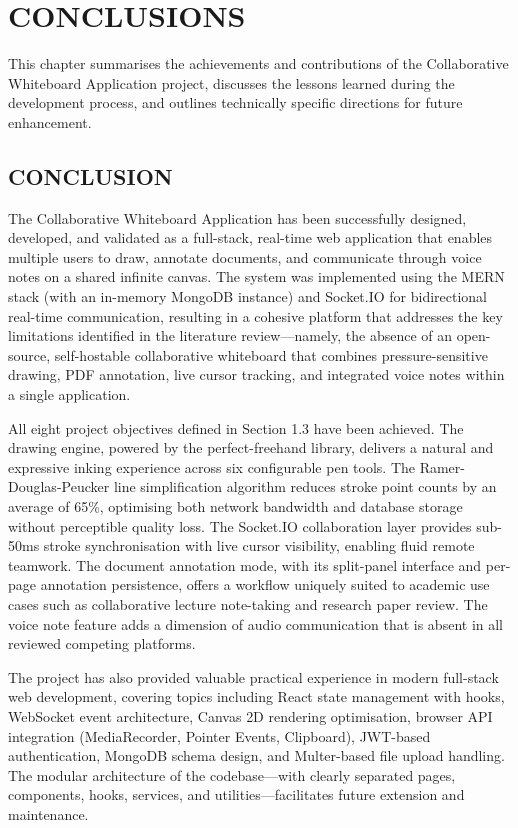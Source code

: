 \documentclass[12pt,a4paper]{report}
\begin{document}
\chapter{CONCLUSIONS}
\thispagestyle{empty}

This chapter summarises the achievements and contributions of the Collaborative Whiteboard Application project, discusses the lessons learned during the development process, and outlines technically specific directions for future enhancement.

\section{CONCLUSION}

The Collaborative Whiteboard Application has been successfully designed, developed, and validated as a full-stack, real-time web application that enables multiple users to draw, annotate documents, and communicate through voice notes on a shared infinite canvas. The system was implemented using the MERN stack (with an in-memory MongoDB instance) and Socket.IO for bidirectional real-time communication, resulting in a cohesive platform that addresses the key limitations identified in the literature review---namely, the absence of an open-source, self-hostable collaborative whiteboard that combines pressure-sensitive drawing, PDF annotation, live cursor tracking, and integrated voice notes within a single application.

All eight project objectives defined in Section 1.3 have been achieved. The drawing engine, powered by the perfect-freehand library, delivers a natural and expressive inking experience across six configurable pen tools. The Ramer-Douglas-Peucker line simplification algorithm reduces stroke point counts by an average of 65\%, optimising both network bandwidth and database storage without perceptible quality loss. The Socket.IO collaboration layer provides sub-50ms stroke synchronisation with live cursor visibility, enabling fluid remote teamwork. The document annotation mode, with its split-panel interface and per-page annotation persistence, offers a workflow uniquely suited to academic use cases such as collaborative lecture note-taking and research paper review. The voice note feature adds a dimension of audio communication that is absent in all reviewed competing platforms.

The project has also provided valuable practical experience in modern full-stack web development, covering topics including React state management with hooks, WebSocket event architecture, Canvas 2D rendering optimisation, browser API integration (MediaRecorder, Pointer Events, Clipboard), JWT-based authentication, MongoDB schema design, and Multer-based file upload handling. The modular architecture of the codebase---with clearly separated pages, components, hooks, services, and utilities---facilitates future extension and maintenance.
\end{document}
